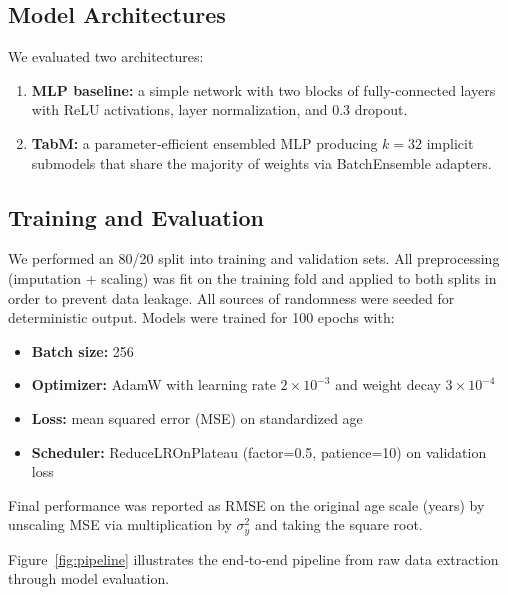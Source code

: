 \documentclass[manuscript,screen,review]{acmart}
\begin{document}
\subsection{Model Architectures}
We evaluated two architectures:
\begin{enumerate}
  \item \textbf{MLP baseline:} a simple network with two blocks of fully-connected layers with ReLU activations, layer normalization, and $0.3$ dropout.
  \item \textbf{TabM:} a parameter‐efficient ensembled MLP \cite{gorishniy2025tabm} producing \(k=32\) implicit submodels that share the majority of weights via BatchEnsemble adapters.
\end{enumerate}

\subsection{Training and Evaluation}
We performed an 80/20 split into training and validation sets. All preprocessing (imputation + scaling) was fit on the training fold and applied to both splits in order to prevent data leakage. All sources of randomness were seeded for deterministic output. Models were trained for 100 epochs with:
\begin{itemize}
  \item \textbf{Batch size:} 256  
  \item \textbf{Optimizer:} AdamW with learning rate $2\times10^{-3}$ and weight decay $3\times10^{-4}$  
  \item \textbf{Loss:} mean squared error (MSE) on standardized age  
  \item \textbf{Scheduler:} ReduceLROnPlateau (factor=0.5, patience=10) on validation loss  
\end{itemize}
Final performance was reported as RMSE on the original age scale (years) by unscaling MSE via multiplication by $\sigma_y^2$ and taking the square root.

Figure~\ref{fig:pipeline} illustrates the end‐to‐end pipeline from raw data extraction through model evaluation.
\end{document}
